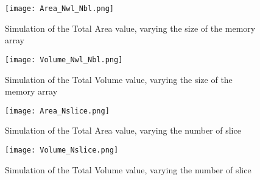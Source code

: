\begin{center}
	\begin{figure}[H]
		\centering
		\texttt{[image: Area\_Nwl\_Nbl.png]}
		\caption{Simulation of the Total Area value, varying the size of the memory array} 
		\label{fig:1}
	\end{figure}
\end{center}

\begin{center}
	\begin{figure}[H]
		\centering
		\texttt{[image: Volume\_Nwl\_Nbl.png]}
		\caption{Simulation of the Total Volume value, varying the size of the memory array}
		\label{fig:2} 
	\end{figure}
\end{center}

\begin{center}
	\begin{figure}[H]
		\centering
		\texttt{[image: Area\_Nslice.png]}
		\caption{Simulation of the Total Area value, varying the number of slice} 
		\label{fig:3}
	\end{figure}
\end{center}

\begin{center}
	\begin{figure}[H]
		\centering
		\texttt{[image: Volume\_Nslice.png]}
		\caption{Simulation of the Total Volume value, varying the number of slice} 
		\label{fig:4}
	\end{figure}
\end{center}
